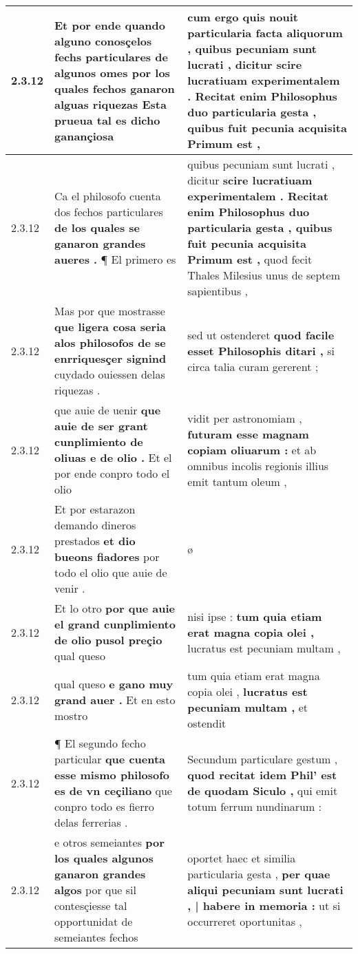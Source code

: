 \begin{tabular}{|p{1cm}|p{6.5cm}|p{6.5cm}|}
2.3.12 & Et por ende quando alguno conosçelos fechs particulares de algunos omes \textbf{ por los quales fechos ganaron alguas riquezas } Esta prueua tal es dicho ganançiosa & cum ergo quis nouit particularia facta aliquorum , \textbf{ quibus pecuniam sunt lucrati , dicitur } scire lucratiuam experimentalem . Recitat enim Philosophus duo particularia gesta , quibus fuit pecunia acquisita Primum est , \\\hline
2.3.12 & Ca el philosofo cuenta dos fechos particulares \textbf{ de los quales se ganaron grandes aueres . } ¶ El primero es & quibus pecuniam sunt lucrati , dicitur \textbf{ scire lucratiuam experimentalem . Recitat enim Philosophus duo particularia gesta , quibus fuit pecunia acquisita Primum est , } quod fecit Thales Milesius unus de septem sapientibus , \\\hline
2.3.12 & Mas por que mostrasse \textbf{ que ligera cosa seria alos philosofos de se enrriquesçer signind } cuydado ouiessen delas riquezas . & sed ut ostenderet \textbf{ quod facile esset Philosophis ditari , } si circa talia curam gererent ; \\\hline
2.3.12 & que auie de uenir \textbf{ que auie de ser grant cunplimiento de oliuas e de olio . } Et el por ende conpro todo el olio & vidit per astronomiam , \textbf{ futuram esse magnam copiam oliuarum : } et ab omnibus incolis regionis illius emit tantum oleum , \\\hline
2.3.12 & Et por estarazon demando dineros prestados \textbf{ et dio bueons fiadores } por todo el olio que auie de venir . & ø \\\hline
2.3.12 & Et lo otro \textbf{ por que auie el grand cunplimiento de olio pusol preçio } qual queso & nisi ipse : \textbf{ tum quia etiam erat magna copia olei , } lucratus est pecuniam multam , \\\hline
2.3.12 & qual queso \textbf{ e gano muy grand auer . } Et en esto mostro & tum quia etiam erat magna copia olei , \textbf{ lucratus est pecuniam multam , } et ostendit \\\hline
2.3.12 & ¶ El segundo fecho particular \textbf{ que cuenta esse mismo philosofo es de vn ceçiliano } que conpro todo es fierro delas ferrerias . & Secundum particulare gestum , \textbf{ quod recitat idem Phil’ est de quodam Siculo , } qui emit totum ferrum nundinarum : \\\hline
2.3.12 & e otros semeiantes \textbf{ por los quales algunos ganaron grandes algos } por que sil contesçiesse tal opportunidat de semeiantes fechos & oportet haec et similia particularia gesta , \textbf{ per quae aliqui pecuniam sunt lucrati , | habere in memoria : } ut si occurreret oportunitas , \\\hline

\end{tabular}
